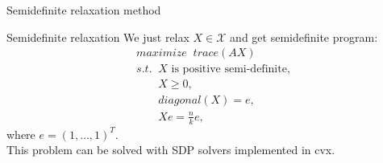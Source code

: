 \documentclass{beamer}
\theoremstyle{definition}
\theoremstyle{plain}
\theoremstyle{remark}
\begin{document}
			\begin{frame}{Semidefinite relaxation method}
				\begin{block}{Semidefinite relaxation}
				We just relax $X \in \mathcal{X}$ and get semidefinite program:
				\begin{equation} 
					\begin{aligned}
						&maximize\;\;trace(AX)\\
						&s.t. \;\;X \text{ is positive semi-definite}, \\
						&\;\;\;\;\;\;\; X \geq 0, \\
						&\;\;\;\;\;\;\; diagonal(X) = e, \\
						&\;\;\;\;\;\;\; Xe = \frac{n}{k}e,
					\nonumber
					\end{aligned}
				\end{equation}
				where $e = (1,\ldots,1)^T$.\\ 
				\vspace{5pt}
				This problem can be solved with SDP solvers implemented in cvx.
				\end{block}
			\end{frame}
\end{document}

